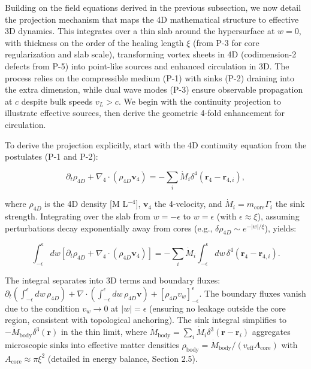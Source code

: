 Building on the field equations derived in the previous subsection, we now detail the projection mechanism that maps the 4D mathematical structure to effective 3D dynamics. This integrates over a thin slab around the hypersurface at $w=0$, with thickness on the order of the healing length $\xi$ (from P-3 for core regularization and slab scale), transforming vortex sheets in 4D (codimension-2 defects from P-5) into point-like sources and enhanced circulation in 3D. The process relies on the compressible medium (P-1) with sinks (P-2) draining into the extra dimension, while dual wave modes (P-3) ensure observable propagation at $c$ despite bulk speeds $v_L > c$. We begin with the continuity projection to illustrate effective sources, then derive the geometric 4-fold enhancement for circulation.

To derive the projection explicitly, start with the 4D continuity equation from the postulates (P-1 and P-2):

\begin{equation}
\partial_t \rho_{4D} + \nabla_4 \cdot (\rho_{4D} \mathbf{v}_4) = -\sum_i \dot{M}_i \delta^4(\mathbf{r}_4 - \mathbf{r}_{4,i}),
\end{equation}

where $\rho_{4D}$ is the 4D density [M L$^{-4}$], $\mathbf{v}_4$ the 4-velocity, and $\dot{M}_i = m_{\text{core}} \Gamma_i$ the sink strength. Integrating over the slab from $w=-\epsilon$ to $w=\epsilon$ (with $\epsilon \approx \xi$), assuming perturbations decay exponentially away from cores (e.g., $\delta \rho_{4D} \sim e^{-|w|/\xi}$), yields:

\[
\int_{-\epsilon}^{\epsilon} dw \left[ \partial_t \rho_{4D} + \nabla_4 \cdot (\rho_{4D} \mathbf{v}_4) \right] = -\sum_i \dot{M}_i \int_{-\epsilon}^{\epsilon} dw \, \delta^4(\mathbf{r}_4 - \mathbf{r}_{4,i}).
\]

The integral separates into 3D terms and boundary fluxes: $\partial_t \left( \int_{-\epsilon}^{\epsilon} dw \, \rho_{4D} \right) + \nabla \cdot \left( \int_{-\epsilon}^{\epsilon} dw \, \rho_{4D} \mathbf{v} \right) + [\rho_{4D} v_w]_{-\epsilon}^{\epsilon}$. The boundary fluxes vanish due to the condition $v_w \to 0$ at $|w| = \epsilon$ (ensuring no leakage outside the core region, consistent with topological anchoring). The sink integral simplifies to $-\dot{M}_{\text{body}} \delta^3(\mathbf{r})$ in the thin limit, where $\dot{M}_{\text{body}} = \sum_i \dot{M}_i \delta^3(\mathbf{r} - \mathbf{r}_i)$ aggregates microscopic sinks into effective matter densities $\rho_{\text{body}} = \dot{M}_{\text{body}} / (v_{\text{eff}} A_{\text{core}})$ with $A_{\text{core}} \approx \pi \xi^2$ (detailed in energy balance, Section 2.5).

